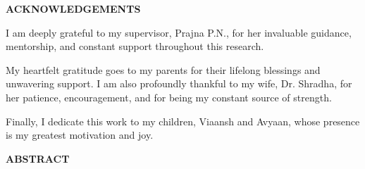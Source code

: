 \clearpage

\setcounter{page}{1}
\begin{center}
\textbf{ACKNOWLEDGEMENTS}
\end{center}
\vspace{1cm}

I am deeply grateful to my supervisor, Prajna P.N., for her invaluable guidance, mentorship, and constant support throughout this research.

My heartfelt gratitude goes to my parents for their lifelong blessings and unwavering support. I am also profoundly thankful to my wife, Dr. Shradha, for her patience, encouragement, and for being my constant source of strength.

Finally, I dedicate this work to my children, Viaansh and Avyaan, whose presence is my greatest motivation and joy.

\clearpage

\begin{singlespace}
\tableofcontents
\clearpage

\listoftables
\clearpage

\listoffigures
\clearpage
\end{singlespace}

\begin{singlespace}

\end{singlespace}
\clearpage

\begin{center}
\textbf{ABSTRACT}
\end{center}
\vspace{1cm}

